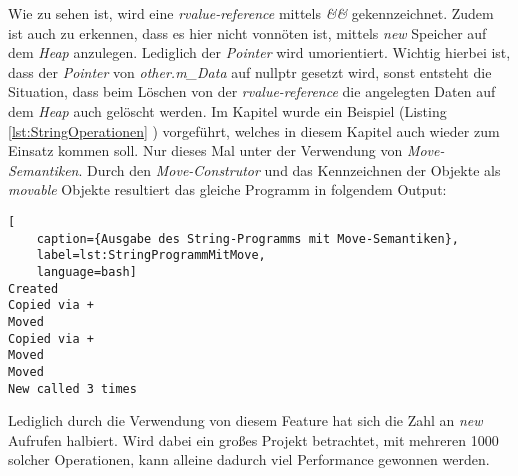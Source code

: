 Wie zu sehen ist, wird eine \emph{rvalue-reference} mittels \emph{\&\&} gekennzeichnet. Zudem ist
auch zu erkennen, dass es hier nicht vonnöten ist, mittels \emph{new} Speicher auf dem \emph{Heap}
anzulegen. Lediglich der \emph{Pointer} wird umorientiert. Wichtig hierbei ist, dass der
\emph{Pointer} von \emph{other.m\_Data} auf nullptr gesetzt wird, sonst entsteht die
Situation, dass beim Löschen von der \emph{rvalue-reference} die angelegten Daten auf dem
\emph{Heap} auch gelöscht werden.
\newline
\newline
Im Kapitel \emph{} wurde ein Beispiel (Listing \ref{lst:StringOperationen}
\emph{}) vorgeführt, welches in diesem Kapitel auch wieder zum
Einsatz kommen soll. Nur dieses Mal unter der Verwendung von \emph{Move-Semantiken}. Durch den
\emph{Move-Construtor} und das Kennzeichnen der Objekte als \emph{movable} Objekte resultiert
das gleiche Programm in folgendem Output:

\begin{lstlisting}[
    caption={Ausgabe des String-Programms mit Move-Semantiken},
    label=lst:StringProgrammMitMove,
    language=bash]
Created
Copied via +
Moved
Copied via +
Moved
Moved
New called 3 times
\end{lstlisting}

Lediglich durch die Verwendung von diesem Feature hat sich die Zahl an \emph{new} Aufrufen halbiert.
Wird dabei ein großes Projekt betrachtet, mit mehreren 1000 solcher Operationen, kann alleine
dadurch viel Performance gewonnen werden.